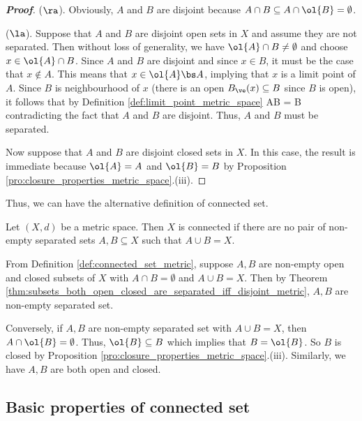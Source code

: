 \begin{proof}[\bf Proof]
($\ra$). Obviously, $A$ and $B$ are disjoint because $A\cap B \subseteq A \cap \ol{B} = \emptyset$.

($\la$). Suppose that $A$ and $B$ are disjoint open sets in $X$ and assume they are not separated. Then without loss of generality, we have $\ol{A} \cap B \neq \emptyset$ and choose $x\in \ol{A}\cap B$. Since $A$ and $B$ are disjoint and since $x\in B$, it must be the case that $x\not\in A$. This means that $x\in \ol{A}\bs A$, implying that $x$ is a limit point of $A$. Since $B$ is neighbourhood of $x$ (there is an open $B_\ve(x)\subseteq B$ since $B$ is open), it follows that by Definition \ref{def:limit_point_metric_space}
\be
A\cap B = B \cap {} \neq \emptyset
\ee
contradicting the fact that $A$ and $B$ are disjoint. Thus, $A$ and $B$ must be separated.

Now suppose that $A$ and $B$ are disjoint closed sets in $X$. In this case, the result is immediate because $\ol{A} = A$ and $\ol{B} = B$ by Proposition \ref{pro:closure_properties_metric_space}.(iii).
\end{proof}

Thus, we can have the alternative definition of connected set.

\begin{definition}\label{def:connected_set_no_separation_metric}
Let $(X,d)$ be a metric space. Then $X$ is connected if there are no pair of non-empty separated sets $A,B\subseteq X$ such that $A\cup B = X$.
\end{definition}

\begin{remark}
From Definition \ref{def:connected_set_metric}, suppose $A,B$ are non-empty open and closed subsets of $X$ with $A\cap B = \emptyset$ and $A\cup B = X$. Then by Theorem \ref{thm:subsets_both_open_closed_are_separated_iff_disjoint_metric}, $A,B$ are non-empty separated set.

Conversely, if $A,B$ are non-empty separated set with $A\cup B = X$, then $A\cap \ol{B} = \emptyset$. Thus, $\ol{B} \subseteq B$ which implies that $B= \ol{B}$. So $B$ is closed by Proposition \ref{pro:closure_properties_metric_space}.(iii). Similarly, we have $A,B$ are both open and closed.
\end{remark}




\subsection{Basic properties of connected set}


